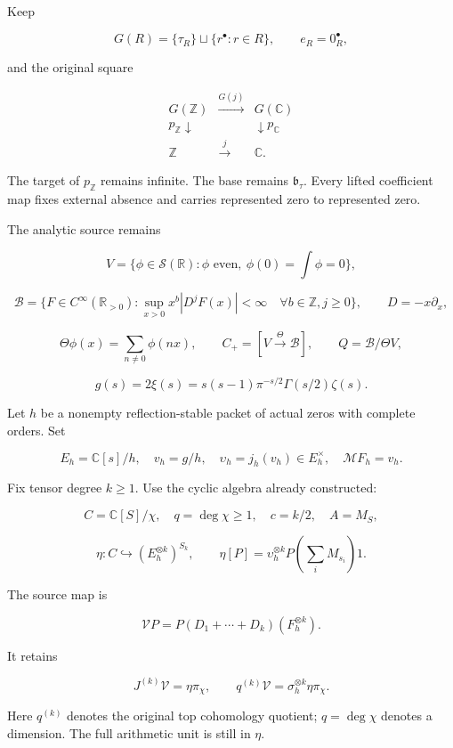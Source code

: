 Keep

\[
G(R)=\{\tau_R\}\sqcup\{r^\bullet:r\in R\},\qquad e_R=0_R^\bullet,
\]

and the original square

\[
\begin{array}{ccc}
G(\mathbb Z)&\xrightarrow{G(j)}&G(\mathbb C)\\
p_{\mathbb Z}\downarrow&&\downarrow p_{\mathbb C}\\
\mathbb Z&\xrightarrow{j}&\mathbb C.
\end{array}
\tag{4}
\]

The target of \(p_{\mathbb Z}\) remains infinite. The base remains
\(\mathfrak b_\tau\). Every lifted coefficient map fixes external
absence and carries represented zero to represented zero.

The analytic source remains

\[
V=\{\phi\in\mathcal S(\mathbb R):\phi\text{ even},\ \phi(0)=\int\phi=0\},
\]

\[
\mathscr B=\{F\in C^\infty(\mathbb R_{>0}):\sup_{x>0}x^b|D^jF(x)|<\infty\quad\forall b\in\mathbb Z,j\ge0\},
\qquad D=-x\partial_x,
\]

\[
\Theta\phi(x)=\sum_{n\ne0}\phi(nx),\qquad
C_+=[V\xrightarrow{\Theta}\mathscr B],\qquad Q=\mathscr B/\Theta V,
\]

\[
g(s)=2\xi(s)=s(s-1)\pi^{-s/2}\Gamma(s/2)\zeta(s).
\]

Let \(h\) be a nonempty reflection-stable packet of actual zeros with
complete orders. Set

\[
E_h=\mathbb C[s]/h,\quad v_h=g/h,\quad
\upsilon_h=j_h(v_h)\in E_h^\times,\quad \mathcal MF_h=v_h.
\]

Fix tensor degree \(k\ge1\). Use the cyclic algebra already constructed:

\[
C=\mathbb C[S]/\chi,\quad q=\deg\chi\ge1,\quad c=k/2,\quad A=M_S,
\]

\[
\eta:C\hookrightarrow(E_h^{\otimes k})^{S_k},\qquad
\eta[P]=\upsilon_h^{\otimes k}P\!\left(\sum_iM_{s_i}\right)1.
\]

The source map is

\[
\mathcal V P=P(D_1+\cdots+D_k)(F_h^{\otimes k}).
\]

It retains

\[
J^{(k)}\mathcal V=\eta\pi_\chi,\qquad
q^{(k)}\mathcal V=\sigma_h^{\otimes k}\eta\pi_\chi.
\tag{5}
\]

Here \(q^{(k)}\) denotes the original top cohomology quotient;
\(q=\deg\chi\) denotes a dimension. The full arithmetic unit is still in
\(\eta\).

